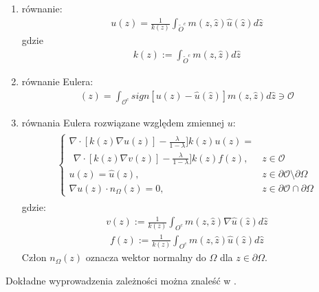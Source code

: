 \documentclass[12pt, twoside, openany]{report}
\theoremstyle{definition}
\begin{document}
\begin{enumerate}
\item
równanie:
\begin{align}
u(z) = \frac{1}{k(z)}\int_{\widetilde O^c}m(z,\hat{z})\hat{u}(\hat{z})d\hat{z}
\end{align}
gdzie
\begin{align}
k(z) := \int_{\widetilde O^c}m(z,\hat{z})d\hat{z}
\end{align}
\item
równanie Eulera:
\begin{align}
[\delta_{u}\mathcal{E}(u)](z) = \int_{\mathcal{O}^c}sign[u(z)-\hat{u}(\hat{z})]m(z,\hat{z})d\hat{z} \ni \mathcal{O} 
\end{align}
\item
równania Eulera rozwiązane względem zmiennej $u$:
\begin{align}
\begin{aligned}
\begin{cases}
\nabla \cdot [k(z)\nabla u(z)] - \frac{\lambda}{1-\lambda}]k(z)u(z) = \\ 
\ \ \nabla \cdot [k(z)\nabla v(z)] - \frac{\lambda}{1-\lambda}]k(z)f(z) , & z \in \mathcal{O} \\
u(z)=\hat{u}(z) , & z \in \partial \mathcal{O} \setminus \partial \Omega \\
\nabla u(z) \cdot n_{\Omega}(z) = 0 , & z \in \partial \mathcal{O} \cap \partial \Omega
\end{cases}
\end{aligned}
\end{align}
gdzie:
\begin{align}
v(z) := \frac{1}{k(z)}\int_{O^c}m(z,\hat{z})\nabla\hat{u}(\hat{z})d\hat{z}
\end{align}
\begin{align}
f(z) := \frac{1}{k(z)}\int_{O^c}m(z,\hat{z})\hat{u}(\hat{z})d\hat{z}
\end{align}
Człon $n_{\Omega}(z)$ oznacza wektor normalny do $\Omega$ dla $z \in \partial \Omega$.
\end{enumerate}
Dokładne wyprowadzenia zależności można znaleść w \cite{arias2011variational}.
\end{document}
